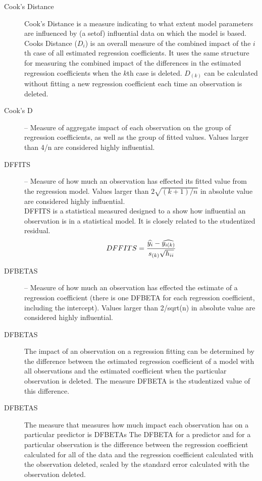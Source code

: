 \documentclass[12pt, a4paper]{report}
\begin{document}
\begin{description}
\item[Cook's Distance] Cook’s Distance is a measure indicating to what extent model parameters are influenced by (a setof) influential data on which the model is based.
				\\
				Cooks Distance ($D_{i}$) is an overall measure of the combined impact of the $i$th case of all estimated regression coefficients. It uses the same structure for measuring the combined impact of the differences in the estimated regression coefficients when the $k$th case is deleted. $D_{(k)}$ can be calculated without fitting
				a new regression coefficient each time an observation is deleted.
				\\
\item[Cook’s D] – Measure of aggregate impact of each observation on the group of regression coefficients, as well as the group of fitted values. Values larger than 4/n are considered highly influential.
				
\item[DFFITS] – Measure of how much an observation has effected its fitted value from the regression model. Values larger than $2\sqrt{(k+1)/n}$ in absolute value are considered highly influential. %
\\
DFFITS is a statistical measured designed to a show how influential an observation is in a statistical model. It is closely related to the studentized residual.
\begin{displaymath} DFFITS = {\widehat{y_i} -
	\widehat{y_{i(k)}} \over s_{(k)} \sqrt{h_{ii}}} \end{displaymath}
\item[DFBETAS] – Measure of how much an observation has effected the estimate of a regression coefficient (there is one DFBETA for each regression coefficient, including the intercept). Values larger than 2/sqrt(n) in absolute value are considered highly influential.

\item[DFBETAS] The impact of an observation on a regression fitting can be determined by the difference between the estimated regression coefficient of a model with all observations and the estimated coefficient when the particular observation is deleted. The measure DFBETA is the studentized value of this difference.

\item[DFBETAS] The measure that measures how much impact each observation has on a particular predictor is DFBETAs The DFBETA for a predictor and for a particular observation is the difference between the regression coefficient calculated for all of the data and the regression coefficient calculated with the observation deleted, scaled by the standard error calculated with the observation deleted. 


\end{description}
\end{document}
